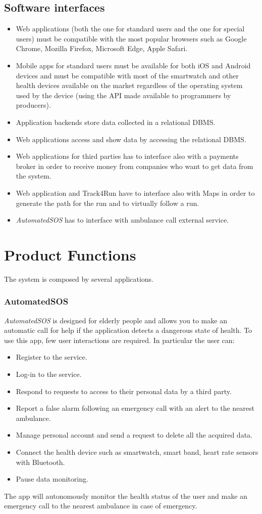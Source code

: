 \subsection{Software interfaces}\label{softwareInterfaces}
\begin{itemize}
\item Web applications (both the one for standard users and the one for special users) must be compatible with the most popular browsers such as Google Chrome, Mozilla Firefox, Microsoft Edge, Apple Safari.
\item	Mobile apps for standard users must be available for both iOS and Android devices and must be compatible with most of the smartwatch and other health devices available on the market regardless of the operating system used by the device (using the API made available to programmers by producers).
\item	Application backends store data collected in a relational DBMS.
\item	 Web applications access and show data by accessing the relational DBMS.
\item	 Web applications for third parties has to interface also with a payments broker in order to receive money from companies who want to get data from the system.
\item Web application and Track4Run have to interface also with Maps in order to generate the path for the run and to virtually follow a run.
\item \textit{AutomatedSOS} has to interface with ambulance call external service.
\end{itemize}

\section{Product Functions}
The system is composed by several applications.
\subsubsection{AutomatedSOS}
\textit{AutomatedSOS} is designed for elderly people and allows you to make an automatic call for help if the application detects a dangerous state of health.
To use this app, few user interactions are required.
In particular the user can:
\begin{itemize}
\item Register to the service.
\item Log-in to the service.
\item Respond to requests to access to their personal data by a third party.
\item Report a false alarm following an emergency call with an alert to the nearest ambulance.
\item Manage personal account and send a request to delete all the acquired data.
\item Connect the health device such as smartwatch, smart band, heart rate sensors with Bluetooth.
\item Pause data monitoring.
\end{itemize}
The app will autonomously monitor the health status of the user and make an emergency call to the nearest ambulance in case of emergency.

